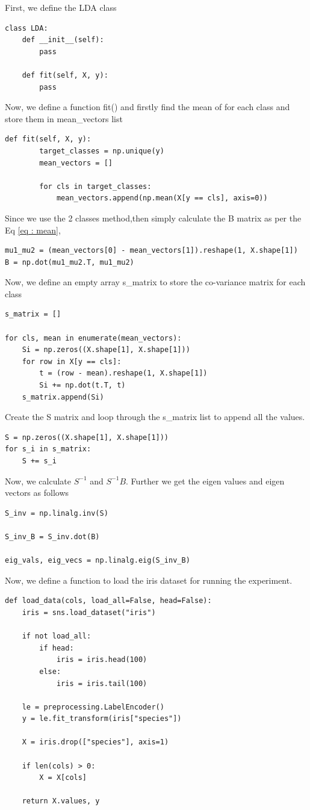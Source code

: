 \documentclass[journal,12pt,twocolumn]{IEEEtran}
\begin{document}
First, we define the LDA class
\begin{lstlisting}
class LDA:
    def __init__(self):
        pass
 
    def fit(self, X, y):
        pass
\end{lstlisting}
Now, we define a function fit() and firstly find the mean of for each class and store them in mean\_vectors list
\begin{lstlisting}
def fit(self, X, y):
        target_classes = np.unique(y)
        mean_vectors = []
 
        for cls in target_classes:
            mean_vectors.append(np.mean(X[y == cls], axis=0))

\end{lstlisting}
Since we use the 2 classes method,then simply calculate the B matrix as per the Eq \eqref{eq : mean},
\begin{lstlisting}
mu1_mu2 = (mean_vectors[0] - mean_vectors[1]).reshape(1, X.shape[1])
B = np.dot(mu1_mu2.T, mu1_mu2)
\end{lstlisting}
Now, we define an empty array s\_matrix to store the co-variance matrix for each class
\begin{lstlisting}
s_matrix = []
 
for cls, mean in enumerate(mean_vectors):
	Si = np.zeros((X.shape[1], X.shape[1]))
	for row in X[y == cls]:
		t = (row - mean).reshape(1, X.shape[1])
		Si += np.dot(t.T, t)
	s_matrix.append(Si)
\end{lstlisting}
Create the S matrix and loop through the s\_matrix list to append all the values.
\begin{lstlisting}
S = np.zeros((X.shape[1], X.shape[1]))
for s_i in s_matrix:
	S += s_i
\end{lstlisting}
Now, we calculate $S^{-1}$ and $S^{-1}B$. Further we get the eigen values and eigen vectors as follows
\begin{lstlisting}
S_inv = np.linalg.inv(S)
 
S_inv_B = S_inv.dot(B)
 
eig_vals, eig_vecs = np.linalg.eig(S_inv_B)
\end{lstlisting}
Now, we define a function to load the iris dataset for running the experiment.
\begin{lstlisting}
def load_data(cols, load_all=False, head=False):
    iris = sns.load_dataset("iris")
 
    if not load_all:
        if head:
            iris = iris.head(100)
        else:
            iris = iris.tail(100)
 
    le = preprocessing.LabelEncoder()
    y = le.fit_transform(iris["species"])
 
    X = iris.drop(["species"], axis=1)
 
    if len(cols) > 0:
        X = X[cols]
 
    return X.values, y
\end{lstlisting}
\end{document}

